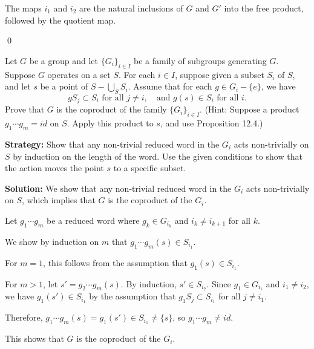 The maps $i_1$ and $i_2$ are the natural inclusions of $G$ and $G'$ into the free product, followed by the quotient map.


\qed
\begin{problembox}
Let $G$ be a group and let $\{G_i\}_{i \in I}$ be a family of subgroups generating $G$. Suppose $G$ operates on a set $S$. For each $i \in I$, suppose given a subset $S_i$ of $S$, and let $s$ be a point of $S - \bigcup_S S_i$. Assume that for each $g \in G_i - \{e\}$, we have
\[gS_j \subset S_i \text{ for all } j \neq i, \quad \text{and } g(s) \in S_i \text{ for all } i.\]
Prove that $G$ is the coproduct of the family $\{G_i\}_{i \in I}$. (Hint: Suppose a product $g_1 \cdots g_m = id$ on $S$. Apply this product to $s$, and use Proposition 12.4.)
\end{problembox}

\noindent\textbf{Strategy:} Show that any non-trivial reduced word in the $G_i$ acts non-trivially on $S$ by induction on the length of the word. Use the given conditions to show that the action moves the point $s$ to a specific subset.

\noindent\textbf{Solution:} We show that any non-trivial reduced word in the $G_i$ acts non-trivially on $S$, which implies that $G$ is the coproduct of the $G_i$.

Let $g_1 \cdots g_m$ be a reduced word where $g_k \in G_{i_k}$ and $i_k \neq i_{k+1}$ for all $k$.

We show by induction on $m$ that $g_1 \cdots g_m(s) \in S_{i_1}$.

For $m = 1$, this follows from the assumption that $g_1(s) \in S_{i_1}$.

For $m > 1$, let $s' = g_2 \cdots g_m(s)$. By induction, $s' \in S_{i_2}$. Since $g_1 \in G_{i_1}$ and $i_1 \neq i_2$, we have $g_1(s') \in S_{i_1}$ by the assumption that $g_1S_j \subset S_{i_1}$ for all $j \neq i_1$.

Therefore, $g_1 \cdots g_m(s) = g_1(s') \in S_{i_1} \neq \{s\}$, so $g_1 \cdots g_m \neq id$.

This shows that $G$ is the coproduct of the $G_i$.


